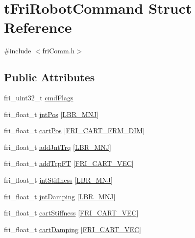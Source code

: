 \hypertarget{structtFriRobotCommand}{\section{t\-Fri\-Robot\-Command \-Struct \-Reference}
\label{structtFriRobotCommand}
}


{\ttfamily \#include $<$fri\-Comm.\-h$>$}

\subsection*{\-Public \-Attributes}
\begin{DoxyCompactItemize}
\item 
fri\-\_\-uint32\-\_\-t \hyperlink{structtFriRobotCommand_a281d911c64b7603edab47c904f5961b3}{cmd\-Flags}
\item 
fri\-\_\-float\-\_\-t \hyperlink{structtFriRobotCommand_a4bac642e487860d390d038354e2da10b}{jnt\-Pos} \mbox{[}\hyperlink{friComm_8h_a14d10dff3deb8105d27539540b23ed6e}{\-L\-B\-R\-\_\-\-M\-N\-J}\mbox{]}
\item 
fri\-\_\-float\-\_\-t \hyperlink{structtFriRobotCommand_a5fd5344efcb521078a4ee5f50e68ff88}{cart\-Pos} \mbox{[}\hyperlink{friComm_8h_a6a3464c8f97968859a8e68c18a414297}{\-F\-R\-I\-\_\-\-C\-A\-R\-T\-\_\-\-F\-R\-M\-\_\-\-D\-I\-M}\mbox{]}
\item 
fri\-\_\-float\-\_\-t \hyperlink{structtFriRobotCommand_a07743e3a1bcba4c45b78b9f5a1015077}{add\-Jnt\-Trq} \mbox{[}\hyperlink{friComm_8h_a14d10dff3deb8105d27539540b23ed6e}{\-L\-B\-R\-\_\-\-M\-N\-J}\mbox{]}
\item 
fri\-\_\-float\-\_\-t \hyperlink{structtFriRobotCommand_abee53add49473f5a3b4f276f115afef1}{add\-Tcp\-F\-T} \mbox{[}\hyperlink{friComm_8h_a1286cc3f1315de7fac9fed0e6e4b98cb}{\-F\-R\-I\-\_\-\-C\-A\-R\-T\-\_\-\-V\-E\-C}\mbox{]}
\item 
fri\-\_\-float\-\_\-t \hyperlink{structtFriRobotCommand_a7127d490d4fed38a755d5f8fb20bfa9c}{jnt\-Stiffness} \mbox{[}\hyperlink{friComm_8h_a14d10dff3deb8105d27539540b23ed6e}{\-L\-B\-R\-\_\-\-M\-N\-J}\mbox{]}
\item 
fri\-\_\-float\-\_\-t \hyperlink{structtFriRobotCommand_a6977a609aa6619c7d567a25b87c3d3ae}{jnt\-Damping} \mbox{[}\hyperlink{friComm_8h_a14d10dff3deb8105d27539540b23ed6e}{\-L\-B\-R\-\_\-\-M\-N\-J}\mbox{]}
\item 
fri\-\_\-float\-\_\-t \hyperlink{structtFriRobotCommand_ac999a3b8870c89afef26d14eac46c3ec}{cart\-Stiffness} \mbox{[}\hyperlink{friComm_8h_a1286cc3f1315de7fac9fed0e6e4b98cb}{\-F\-R\-I\-\_\-\-C\-A\-R\-T\-\_\-\-V\-E\-C}\mbox{]}
\item 
fri\-\_\-float\-\_\-t \hyperlink{structtFriRobotCommand_adcfcf4a2d60cc0b93170cdf8900798d0}{cart\-Damping} \mbox{[}\hyperlink{friComm_8h_a1286cc3f1315de7fac9fed0e6e4b98cb}{\-F\-R\-I\-\_\-\-C\-A\-R\-T\-\_\-\-V\-E\-C}\mbox{]}
\end{DoxyCompactItemize}



